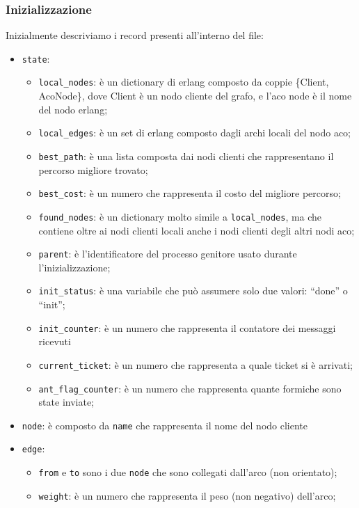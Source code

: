 \subsubsection{Inizializzazione}
Inizialmente descriviamo i record presenti all'interno del file:
\begin{itemize}
    \item \texttt{state}: 
    \begin{itemize}
        \item \texttt{local\_nodes}: è un dictionary di erlang composto da coppie \{Client, AcoNode\}, dove Client è un nodo cliente del grafo, e l'aco node è il nome del nodo erlang;
        \item \texttt{local\_edges}: è un set di erlang composto dagli archi locali del nodo aco;
        \item \texttt{best\_path}: è una lista composta dai nodi clienti che rappresentano il percorso migliore trovato;
        \item \texttt{best\_cost}: è un numero che rappresenta il costo del migliore percorso;
        \item \texttt{found\_nodes}: è un dictionary molto simile a \texttt{local\_nodes}, ma che contiene oltre ai nodi clienti locali anche i nodi clienti degli altri nodi aco;
        \item \texttt{parent}: è l'identificatore del processo genitore usato durante l'inizializzazione;
        \item \texttt{init\_status}: è una variabile che può assumere solo due valori: ``done'' o ``init'';
        \item \texttt{init\_counter}: è un numero che rappresenta il contatore dei messaggi ricevuti
        \item \texttt{current\_ticket}: è un numero che rappresenta a quale ticket si è arrivati;
        \item \texttt{ant\_flag\_counter}: è un numero che rappresenta quante formiche sono state inviate;
    \end{itemize}
    \item \texttt{node}: è composto da \texttt{name} che rappresenta il nome del nodo cliente
    \item \texttt{edge}:
    \begin{itemize}
        \item \texttt{from} e \texttt{to} sono i due \texttt{node} che sono collegati dall'arco (non orientato);
        \item \texttt{weight}: è un numero che rappresenta il peso (non negativo) dell'arco;

\end{itemize}
\end{itemize}
